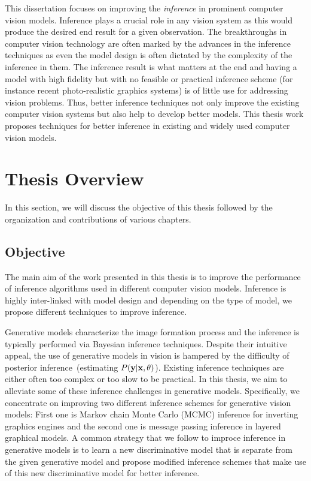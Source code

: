 This dissertation focuses on improving the \textit{inference} in
prominent computer vision models. Inference plays a crucial role in any vision
system as this would produce the desired end result for a given observation.
The breakthroughs in computer vision technology are often marked by the advances
in the inference techniques as even the model design is often dictated by the
complexity of the inference in them.
The inference result is what matters at the end and
having a model with high fidelity but with no feasible or practical inference scheme
(for instance recent photo-realistic graphics systems) is of little use for
addressing vision problems.
Thus, better inference techniques not only improve the existing computer
vision systems but also help to develop better models. This thesis work
proposes techniques for better inference in existing and widely used computer
vision models.

\section{Thesis Overview}

In this section, we will discuss the objective of this thesis followed by the
organization and contributions of various chapters.

\subsection{Objective}

The main aim of the work presented in this thesis is to improve the performance
of inference algorithms used in different computer vision models. Inference is
highly inter-linked with model design and depending on the type of model, we
propose different techniques to improve inference.

Generative models characterize the image formation process and the inference is
typically performed via Bayesian inference techniques. Despite their
intuitive appeal, the use of generative models in vision is hampered by the
difficulty of posterior inference~(estimating $P(\mathbf{y}|\mathbf{x},\mathbf{\theta})$).
Existing inference techniques are either often too
complex or too slow to be practical. In this thesis, we aim to alleviate some
of these inference challenges in generative models. Specifically, we concentrate
on improving two different inference schemes for generative vision models: First one is
Markov chain Monte Carlo (MCMC) inference for inverting graphics
engines and the second one is message passing inference in layered graphical models.
A common strategy that we follow to improce inference in generative models is
to learn a new discriminative model that is separate from the given generative
model and propose modified inference schemes that make use of this new discriminative
model for better inference.

